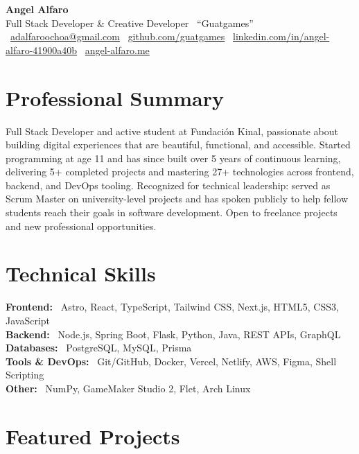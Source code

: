 \documentclass[10.5pt,a4paper]{article}
\newcommand{\iconEmail}{\faEnvelope\ }
\newcommand{\iconGithub}{\faGithub\ }
\newcommand{\iconLinkedin}{\faLinkedin\ }
\newcommand{\iconGlobe}{\faGlobe\ }
\newcommand{\iconEmail}{\Email\ }
\newcommand{\iconGithub}{}
\newcommand{\iconLinkedin}{}
\newcommand{\iconGlobe}{}
\newcommand{\skillrow}[2]{%
  \textbf{\color{darknavy}#1:} \, #2\\[3pt]
}
\begin{document}
\begin{center}
  {\Huge\bfseries\color{darknavy} Angel Alfaro}\\[3pt]
  {\large\color{accent} Full Stack Developer \& Creative Developer \textbar\ ``Guatgames''}\\[6pt]
  {\small
    \iconEmail\href{mailto:adalfaroochoa@gmail.com}{adalfaroochoa@gmail.com} \quad\textbar\quad
    \iconGithub\href{https://github.com/guatgames}{github.com/guatgames} \quad\textbar\quad
    \iconLinkedin\href{https://www.linkedin.com/in/angel-alfaro-41900a40b}{linkedin.com/in/angel-alfaro-41900a40b} \quad\textbar\quad
    \iconGlobe\href{https://angel-alfaro.me}{angel-alfaro.me}
  }
\end{center}

\vspace{2pt}

\section*{Professional Summary}
Full Stack Developer and active student at Fundación Kinal, passionate about building digital experiences that are beautiful, functional, and accessible. Started programming at age 11 and has since built over 5 years of continuous learning, delivering 5+ completed projects and mastering 27+ technologies across frontend, backend, and DevOps tooling. Recognized for technical leadership: served as Scrum Master on university-level projects and has spoken publicly to help fellow students reach their goals in software development. Open to freelance projects and new professional opportunities.

\section*{Technical Skills}
\skillrow{Frontend}{Astro, React, TypeScript, Tailwind CSS, Next.js, HTML5, CSS3, JavaScript}
\skillrow{Backend}{Node.js, Spring Boot, Flask, Python, Java, REST APIs, GraphQL}
\skillrow{Databases}{PostgreSQL, MySQL, Prisma}
\skillrow{Tools \& DevOps}{Git/GitHub, Docker, Vercel, Netlify, AWS, Figma, Shell Scripting}
\skillrow{Other}{NumPy, GameMaker Studio 2, Flet, Arch Linux}

\section*{Featured Projects}
\end{document}
